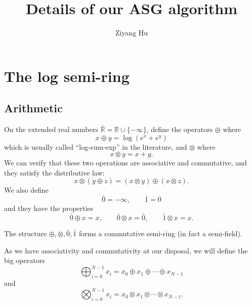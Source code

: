 \documentclass[a4paper]{article}
\title{Details of our ASG algorithm}
\author{Ziyang Hu}
\begin{document}
\maketitle
\tableofcontents
\newpage
\section{The log semi-ring}

\subsection{Arithmetic}

On the extended real numbers $\bar{\mathbb{R}}=\mathbb{R}\cup \{-\infty\}$, define the operators $\oplus$ where
\begin{equation}
x \oplus y = \log(e^x+e^y)
\end{equation}
which is usually called ``log-sum-exp'' in the literature, and $\otimes$ where
\begin{equation}
x \otimes y = x + y.
\end{equation}
We can verify that these two operations are associative and commutative, and they satisfy the distributive law:
\begin{equation}
x\otimes(y\oplus z) = (x\otimes y)\oplus(x\otimes z).
\end{equation}
We also define
\begin{equation}
\bar{0} = -\infty, \qquad \bar{1} = 0
\end{equation}
and they have the properties
\begin{equation}
\bar{0}\oplus x = x, \qquad \bar{0}\otimes x = \bar{0}, \qquad \bar{1}\otimes x = x.
\end{equation}

The structure $\oplus, \otimes, \bar{0}, \bar{1}$ forms a commutative semi-ring (in fact a semi-field).

As we have associativity and commutativity at our disposal, we will define the big operators
\begin{equation}
\bigoplus_{i=0}^{N-1} x_i = x_0 \oplus x_1 \oplus \cdots \oplus x_{N-1}
\end{equation}
and
\begin{equation}
\bigotimes_{i=0}^{N-1} x_i = x_0 \otimes x_1 \otimes \cdots \otimes x_{N-1}.
\end{equation}
\end{document}
